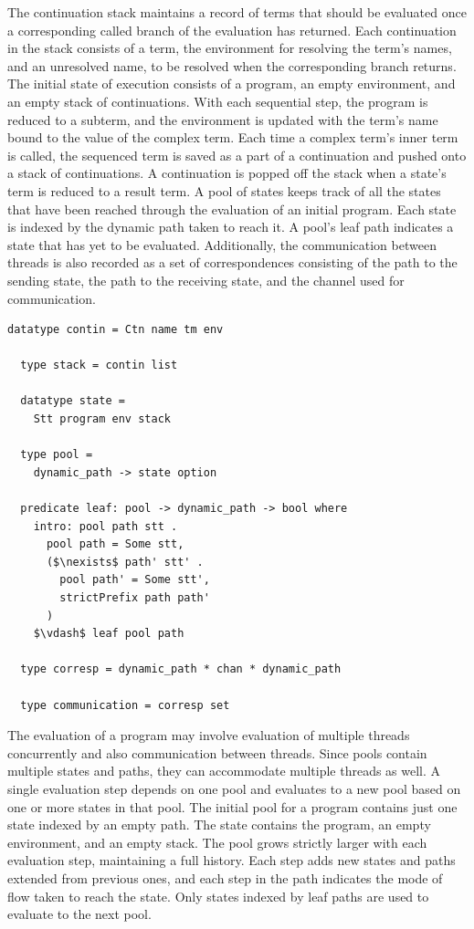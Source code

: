 \documentclass[letterpaper, 11pt]{extarticle}
\begin{document}
The continuation stack maintains a record of terms that should be evaluated
once a corresponding called branch of the evaluation has returned.
Each continuation in the stack consists of a term, the environment for resolving the
term's names, and an unresolved name, to be resolved when the corresponding branch returns. 
The initial state of execution consists of a program, an empty environment, and an empty stack
of continuations. With each sequential step, the program is reduced to a subterm,
and the environment is updated with the term's name bound to the value of the complex term.
Each time a complex term's inner term is called, the sequenced term is saved as a part of a continuation
and pushed onto a stack of continuations. A continuation is popped off the stack when a
state's term is reduced to a result term. A pool of states keeps track of all the states
that have been reached through the evaluation of an initial program. Each state is indexed by
the dynamic path taken to reach it. A pool's leaf path indicates a state that has yet to be
evaluated. Additionally, the communication between threads is also recorded as a set of
correspondences consisting of the path to the sending state, the path to the receiving state,
and the channel used for communication.

\begin{lstlisting}[language=logic, mathescape]
  datatype contin = Ctn name tm env

  type stack = contin list

  datatype state =
    Stt program env stack 

  type pool =
    dynamic_path -> state option

  predicate leaf: pool -> dynamic_path -> bool where
    intro: pool path stt .
      pool path = Some stt,
      ($\nexists$ path' stt' .
        pool path' = Some stt',
        strictPrefix path path'
      )
    $\vdash$ leaf pool path

  type corresp = dynamic_path * chan * dynamic_path

  type communication = corresp set 
\end{lstlisting}

The evaluation of a program may involve evaluation of multiple threads concurrently and also
communication between threads. Since pools contain multiple states and paths, they can
accommodate multiple threads as well. A single evaluation step depends on one pool and
evaluates to a new pool based on one or more states in that pool. The initial pool for a
program contains just one state indexed by an empty path. The state contains the program, an
empty environment, and an empty stack. The pool grows strictly larger with each evaluation
step, maintaining a full history. Each step adds new states and paths extended from previous
ones, and each step in the path indicates the mode of flow taken to reach the state.
Only states indexed by leaf paths are used to evaluate to the next pool.
\end{document}
